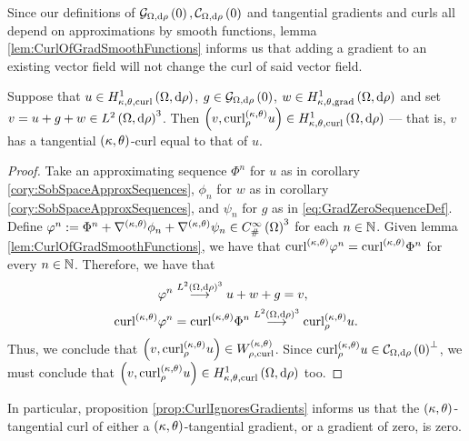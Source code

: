 Since our definitions of $\gradZero{\ddom}{\rho}, \curlZero{\ddom}{\rho}$ and tangential gradients and curls all depend on approximations by smooth functions, lemma \ref{lem:CurlOfGradSmoothFunctions} informs us that adding a gradient to an existing vector field will not change the curl of said vector field.
\begin{prop} \label{prop:CurlIgnoresGradients}
	Suppose that $u\in\ktcurlSob{\ddom}{\rho}$, $g\in\gradZero{\ddom}{\rho}$, $w\in\ktgradSob{\ddom}{\rho}$ and set $v = u + g + w\in\ltwo{\ddom}{\rho}^3$. 
	Then $\bracs{v, \ktcurl{\rho}u}\in\ktcurlSob{\ddom}{\rho}$ --- that is, $v$ has a tangential $\kt$-curl equal to that of $u$.
\end{prop}
\begin{proof}
	Take an approximating sequence $\Phi^n$ for $u$ as in corollary \ref{cory:SobSpaceApproxSequences}, $\phi_n$ for $w$ as in  corollary \ref{cory:SobSpaceApproxSequences}, and $\psi_n$ for $g$ as in \eqref{eq:GradZeroSequenceDef}.
	Define $\varphi^n := \Phi^n + \ktgrad\phi_n + \ktgrad\psi_n\in\psmooth{\ddom}^3$ for each $n\in\naturals$.
	Given lemma \ref{lem:CurlOfGradSmoothFunctions}, we have that $\ktcurl{}\varphi^n = \ktcurl{}\Phi^n$ for every $n\in\naturals$.
	Therefore, we have that
	\begin{align*}
		\varphi^n &\lconv{\ltwo{\ddom}{\rho}^3} u + w + g = v, \\
		\ktcurl{}\varphi^n &= \ktcurl{}\Phi^n 
		\lconv{\ltwo{\ddom}{\rho}^3} \ktcurl{\rho}u.
	\end{align*}
	Thus, we conclude that $\bracs{v, \ktcurl{\rho}u}\in W^{\kt}_{\rho, \mathrm{curl}}$.
	Since $\ktcurl{\rho}u\in\curlZero{\ddom}{\rho}^\perp$, we must conclude that $\bracs{ v, \ktcurl{\rho}u }\in\ktcurlSob{\ddom}{\rho}$ too.
\end{proof}
In particular, proposition \ref{prop:CurlIgnoresGradients} informs us that the $\kt$-tangential curl of either a $\kt$-tangential gradient, or a gradient of zero, is zero.

